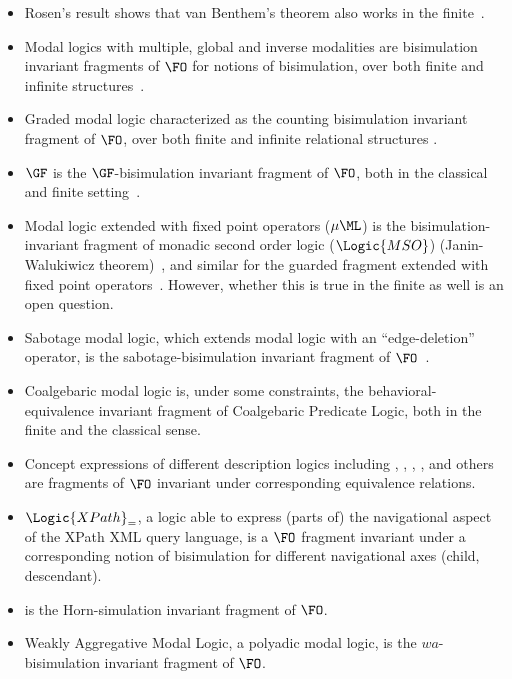 \begin{itemize}
  \item Rosen's result shows that van Benthem's theorem also works in the finite~\cite{Rosen97}.
  \item Modal logics with multiple, global and inverse modalities are bisimulation invariant fragments of $\FO$ for notions of bisimulation, over both finite and infinite structures~\cite{Otto04}.
  \item Graded modal logic characterized as the counting bisimulation invariant fragment of $\FO$, over both finite and infinite relational structures \cite{derijke2000,otto2023}.
  \item $\GF$ is the $\GF$-bisimulation invariant fragment of $\FO$, both in the classical~\cite{AndrekaNB98} and finite setting~\cite{Otto2012}.
  \item Modal logic extended with fixed point operators ($\mu\ML$) is the bisimulation-invariant fragment of monadic second order logic ($\Logic{MSO}$) (Janin-Walukiwicz theorem)~\cite{janin1996}, and similar for the guarded fragment extended with fixed point operators~\cite{gradel2002}.
        However, whether this is true in the finite as well is an open question.
  \item Sabotage modal logic, which extends modal logic with an ``edge-deletion'' operator, is the sabotage-bisimulation invariant fragment of $\FO$~\cite{aucher2015}.
  \item Coalgebaric modal logic is, under some constraints, the behavioral-equivalence invariant fragment of Coalgebaric Predicate Logic\cite{litak2012}, both in the finite and the classical sense.
  \item Concept expressions of different description logics including , , , ,  and others are fragments of $\FO$ invariant under corresponding equivalence relations\cite{kurtonina1999, lutz2011, piro2013}.
  \item $\Logic{XPath}_{=}$, a logic able to express (parts of) the navigational aspect of the XPath XML query language, is a $\FO$ fragment invariant under a corresponding notion of bisimulation for different navigational axes (child, descendant)\cite{figueira2015}.
  \item {} is the Horn-simulation invariant fragment of $\FO$\cite{jung2019}.
  \item Weakly Aggregative Modal Logic, a polyadic modal logic, is the $wa$-bisimulation invariant fragment of $\FO$.
\end{itemize}

